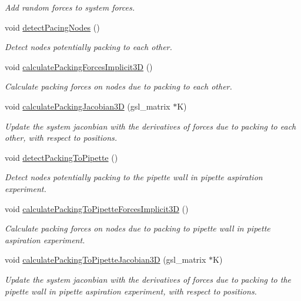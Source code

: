 \begin{DoxyCompactItemize}
\begin{DoxyCompactList}\small\item\em Add random forces to system forces. \end{DoxyCompactList}\item 
void \hyperlink{classSimulation_ab67230d22a5c07292574d10d5ee8fc13}{detect\+Pacing\+Nodes} ()
\begin{DoxyCompactList}\small\item\em Detect nodes potentially packing to each other. \end{DoxyCompactList}\item 
void \hyperlink{classSimulation_a77e76f4fe61889b9c0ae18436a7fd2fb}{calculate\+Packing\+Forces\+Implicit3\+D} ()
\begin{DoxyCompactList}\small\item\em Calculate packing forces on nodes due to packing to each other. \end{DoxyCompactList}\item 
void \hyperlink{classSimulation_a07d76a2495e1b863ab0cdb7185821bec}{calculate\+Packing\+Jacobian3\+D} (gsl\+\_\+matrix $\ast$K)
\begin{DoxyCompactList}\small\item\em Update the system jaconbian with the derivatives of forces due to packing to each other, with respect to positions. \end{DoxyCompactList}\item 
void \hyperlink{classSimulation_a97927bd45513fc16d7dd56b9e8474f4a}{detect\+Packing\+To\+Pipette} ()
\begin{DoxyCompactList}\small\item\em Detect nodes potentially packing to the pipette wall in pipette aspiration experiment. \end{DoxyCompactList}\item 
void \hyperlink{classSimulation_af18305ef63492bb7e76f79c4c85206d0}{calculate\+Packing\+To\+Pipette\+Forces\+Implicit3\+D} ()
\begin{DoxyCompactList}\small\item\em Calculate packing forces on nodes due to packing to pipette wall in pipette aspiration experiment. \end{DoxyCompactList}\item 
void \hyperlink{classSimulation_aeebe76bd38ce67afd3611ad521450c1f}{calculate\+Packing\+To\+Pipette\+Jacobian3\+D} (gsl\+\_\+matrix $\ast$K)
\begin{DoxyCompactList}\small\item\em Update the system jaconbian with the derivatives of forces due to packing to the pipette wall in pipette aspiration experiment, with respect to positions. \end{DoxyCompactList}\item 

\end{DoxyCompactItemize}
